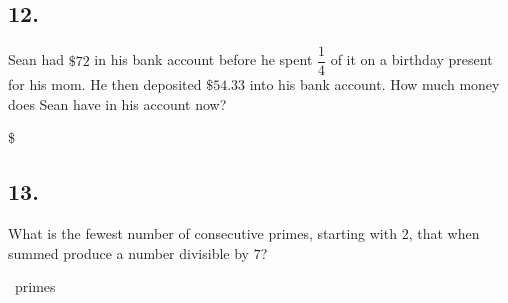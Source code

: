\documentclass[12pt]{article}
\begin{document}
\subsection*{12.}
Sean had $\$72$ in his bank account before he spent $\dfrac{1}{4}$ of it on a birthday present for his mom. He then deposited $\$54.33$ into his bank account. How much money does Sean have in his account now?

\nopagebreak

\$~\fbox{\phantom{ANSWER}}

\begin{answer}
%
\end{answer}


\subsection*{13.}
What is the fewest number of consecutive primes, starting with $2$, that when summed produce a number divisible by $7$?

\nopagebreak

\fbox{\phantom{ANSWER}}~primes
\end{document}
